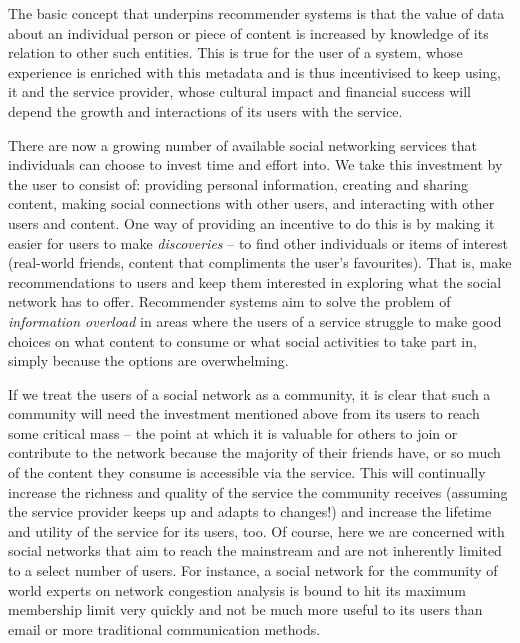 \documentclass[a4paper,12pt,twoside,notitlepage]{report}
\begin{document}
The basic concept that underpins recommender systems is that the value of data
about an individual person or piece of content is increased by knowledge of its
relation to other such entities. This is true for the user of a system, whose
experience is enriched with this metadata and is thus incentivised to keep
using, it and the service provider, whose cultural impact and financial success
will depend the growth and interactions of its users with the service.

There are now a growing number of available social networking services that
individuals can choose to invest time and effort into. We take this investment
by the user to consist of: providing personal information, creating and sharing
content, making social connections with other users, and interacting with other
users and content. One way of providing an incentive to do this is by making it
easier for users to make \emph{discoveries} -- to find other individuals or
items of interest (real-world friends, content that compliments the user's
favourites). That is, make recommendations to users and keep them interested in
exploring what the social network has to offer. Recommender systems aim
to solve the problem of \emph{information overload} in areas where the users of
a service struggle to make good choices on what content to consume or what
social activities to take part in, simply because the options are overwhelming.

If we treat the users of a social network as a community, it is clear that such
a community will need the investment mentioned above from its users to reach
some critical mass -- the point at which it is valuable for others to join 
or contribute to the network because the majority of their friends have, or so 
much of the content they consume is accessible via the service. This will 
continually increase the richness and quality of the service the community 
receives (assuming the service provider keeps up and adapts to changes!) and 
increase the lifetime and utility of the service for its users, too. Of course, 
here we are concerned with social networks that aim to reach the mainstream and 
are not inherently limited to a select number of users. For instance, a social 
network for the community of world experts on network congestion analysis is 
bound to hit its maximum membership limit very quickly and not be much more 
useful to its users than email or more traditional communication methods.
\end{document}
